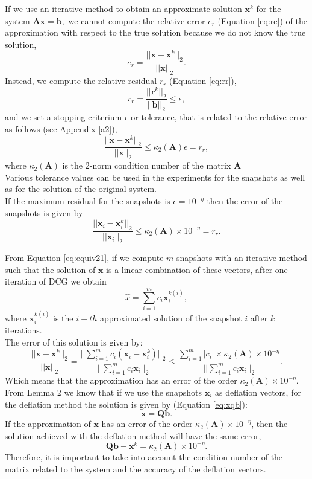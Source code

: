 \documentclass[12pt]{article}
\numberwithin{equation}{section}
\begin{document}
If we use an iterative method to obtain an approximate solution $\mathbf{x}^k$ for the system $\mathbf{A}\mathbf{x}=\mathbf{b},$ we cannot compute the relative error $e_r$ (Equation \ref{eq:re}) of the approximation with respect to the true solution because we do not know the true solution, 
\begin{equation}\label{eq:re}
 e_r=\frac{||\mathbf{x}-\mathbf{x}^k||_2}{||\mathbf{x}||_2}.
\end{equation}
Instead, we compute the relative residual $r_r$ (Equation \ref{eq:rr}), 
\begin{equation}\label{eq:rr}
r_r= \frac{||\mathbf{r}^k||_2}{||\mathbf{b}||_2}\leq \epsilon,
\end{equation}
and we set a stopping criterium $\epsilon$ or tolerance, that is related to the relative error as follows \cite{Saad03} (see Appendix \ref{a2}),
$$\frac{||\mathbf{x}-\mathbf{x}^k||_2}{||\mathbf{x}||_2}\leq \kappa_2(\mathbf{A}) \epsilon=r_r,$$
where $\kappa_2(\mathbf{A})$ is the 2-norm condition number of the matrix $\mathbf{A}$\\
Various tolerance values can be used in the experiments for the snapshots as well as for the solution of the original system. \\
If the maximum residual for the snapshots is $\epsilon=10^{-\eta}$ then the error of the snapshots is given by
$$\frac{||\mathbf{x}_i-\mathbf{x}_i^k||_2}{||\mathbf{x}_i||_2}\leq \kappa_2(\mathbf{A})\times 10^{-\eta}=r_r.$$

From Equation \eqref{eq:equiv21}, if we compute $m$ snapshots with an iterative method such that the solution of $\mathbf{x}$ is a linear combination of these vectors, after one iteration of DCG we obtain
$$\hat{x}=\sum_{i=1}^m {c}_i\mathbf{x}_i^{k(i)},$$
where $\mathbf{x}_i^{k(i)}$ is the $i-th$ approximated solution of the snapshot $i$ after $k$ iterations.\\ 
The error of this solution is given by:
$$\frac{||\mathbf{x}-\mathbf{x}^k||_2}{||\mathbf{x}||_2}=
\frac{||\sum_{i=1}^m {c}_i(\mathbf{x}_i-\mathbf{x}_i^{k})||_2}{||\sum_{i=1}^m {c}_i\mathbf{x}_i||_2}\leq
\frac{\sum_{i=1}^m| {c}_i|\times \kappa_2(\mathbf{A})\times 10^{-\eta}}{||\sum_{i=1}^m {c}_i\mathbf{x}_i||_2}.
$$
Which means that the approximation has an error of the order $\kappa_2(\mathbf{A})\times10^{-\eta}.$
\\From Lemma 2 we know that if we use the snapshots $\mathbf{x}_i$ as deflation vectors, for the deflation method the solution is given by (Equation \ref{eq:xqb}): $$\mathbf{x}=\mathbf{Q}\mathbf{b}.$$ 
If the approximation of $\mathbf{x}$ has an error of the order $\kappa_2(\mathbf{A})\times10^{-\eta}$, then the solution achieved with the deflation method will have the same error, 
$$\mathbf{Q}\mathbf{b}-\mathbf{x}^k=\kappa_2(\mathbf{A})\times10^{-\eta}.$$
Therefore, it is important to take into account the condition number of the matrix related to the system  and the accuracy of the deflation vectors.
\end{document}
